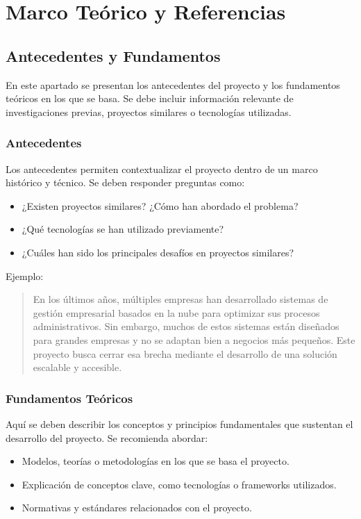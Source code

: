 \chapter{Marco Teórico y Referencias}

\section{Antecedentes y Fundamentos}

En este apartado se presentan los antecedentes del proyecto y los fundamentos teóricos en los que se basa. Se debe incluir información relevante de investigaciones previas, proyectos similares o tecnologías utilizadas.

\subsection{Antecedentes}

Los antecedentes permiten contextualizar el proyecto dentro de un marco histórico y técnico. Se deben responder preguntas como:

\begin{itemize}
	\item ¿Existen proyectos similares? ¿Cómo han abordado el problema?
	\item ¿Qué tecnologías se han utilizado previamente?
	\item ¿Cuáles han sido los principales desafíos en proyectos similares?
\end{itemize}

Ejemplo:
\begin{quote}
	En los últimos años, múltiples empresas han desarrollado sistemas de gestión empresarial basados en la nube para optimizar sus procesos administrativos. Sin embargo, muchos de estos sistemas están diseñados para grandes empresas y no se adaptan bien a negocios más pequeños. Este proyecto busca cerrar esa brecha mediante el desarrollo de una solución escalable y accesible.
\end{quote}



\subsection{Fundamentos Teóricos}

Aquí se deben describir los conceptos y principios fundamentales que sustentan el desarrollo del proyecto. Se recomienda abordar:

\begin{itemize}
	\item Modelos, teorías o metodologías en los que se basa el proyecto.
	\item Explicación de conceptos clave, como tecnologías o frameworks utilizados.
	\item Normativas y estándares relacionados con el proyecto.
\end{itemize}

